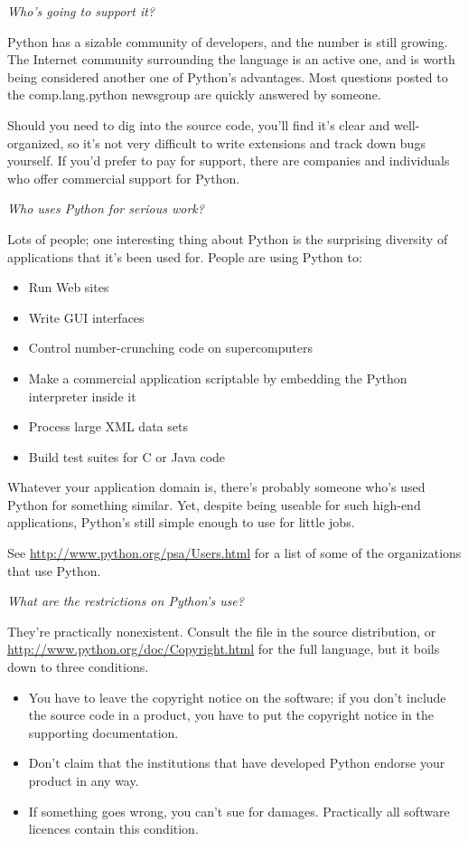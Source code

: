 \documentclass{howto}
\begin{document}
\emph{Who's going to support it?}

Python has a sizable community of developers, and the number is still
growing.  The Internet community surrounding the language is an active
one, and is worth being considered another one of Python's advantages.
Most questions posted to the comp.lang.python newsgroup are quickly
answered by someone.

Should you need to dig into the source code, you'll find it's clear
and well-organized, so it's not very difficult to write extensions and
track down bugs yourself.  If you'd prefer to pay for support, there
are companies and individuals who offer commercial support for Python.

\emph{Who uses Python for serious work?}

Lots of people; one interesting thing about Python is the surprising
diversity of applications that it's been used for.  People are using
Python to:

\begin{itemize}
\item Run Web sites
\item Write GUI interfaces
\item Control
number-crunching code on supercomputers
\item Make a commercial application scriptable by embedding the Python
interpreter inside it
\item Process large XML data sets
\item Build test suites for C or Java code
\end{itemize}

Whatever your application domain is, there's probably someone who's
used Python for something similar.  Yet, despite being useable for
such high-end applications, Python's still simple enough to use for
little jobs.

See \url{http://www.python.org/psa/Users.html} for a list of some of the 
organizations that use Python.

\emph{What are the restrictions on Python's use?}

They're practically nonexistent.  Consult the 
file in the source distribution, or
\url{http://www.python.org/doc/Copyright.html} for the full language,
but it boils down to three conditions.

\begin{itemize}

\item You have to leave the copyright notice on the software; if you
don't include the source code in a product, you have to put the
copyright notice in the supporting documentation.  

\item Don't claim that the institutions that have developed Python
endorse your product in any way.

\item If something goes wrong, you can't sue for damages.  Practically
all software licences contain this condition.

\end{itemize}
\end{document}
